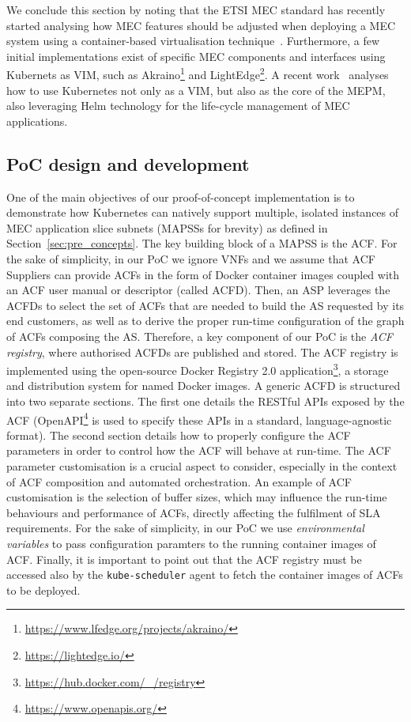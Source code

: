 We conclude this section by noting that the ETSI MEC standard has recently started analysing how MEC features should be adjusted when deploying a MEC system using a container-based virtualisation technique~\cite{MEC027}. Furthermore, a few initial implementations exist of specific MEC components and interfaces using Kubernets as VIM, such as Akraino\footnote{\url{https://www.lfedge.org/projects/akraino/}} and LightEdge\footnote{\url{https://lightedge.io/}}. A recent work~\cite{2020_broadnets_mec_k8s} analyses how to use Kubernetes not only as a VIM, but also as the core of the MEPM, also leveraging Helm technology for the life-cycle management of MEC applications. 
%
\subsection{PoC design and development}
\label{sec:poc_design}
\noindent
%
One of the main objectives of our proof-of-concept implementation is to demonstrate how Kubernetes can natively support multiple, isolated instances of MEC application slice subnets (MAPSSs for brevity) as defined in Section~\ref{sec:pre_concepts}. The key building block of a MAPSS is the ACF. For the sake of simplicity, in our PoC we ignore VNFs and we assume that ACF Suppliers can provide ACFs in the form of Docker container images coupled with an ACF user manual or descriptor (called ACFD). Then, an ASP leverages the ACFDs to select the set of ACFs that are needed to build the AS requested by its end customers, as well as to derive the proper run-time configuration of the graph of ACFs composing the AS. Therefore, a key component of our PoC is the \textit{ACF registry}, where authorised ACFDs are published and stored. The ACF registry is implemented using the open-source Docker Registry 2.0 application\footnote{\url{https://hub.docker.com/_/registry}}, a storage and distribution system for named Docker images. A generic ACFD is structured into two separate sections. The first one details the RESTful APIs exposed by the ACF (OpenAPI\footnote{\url{https://www.openapis.org/}} is used to specify these APIs in a standard, language-agnostic format). The second section details how to properly configure the ACF parameters in order to control how the ACF will behave at run-time. The ACF parameter customisation is a crucial aspect to consider, especially in the context of ACF composition and automated orchestration. An example of ACF customisation is the selection of buffer sizes, which may influence the run-time behaviours and performance of ACFs, directly affecting the fulfilment of SLA requirements. For the sake of simplicity, in our PoC we use \textit{environmental variables} to pass configuration paramters to the running container images of ACF. Finally, it is important to point out that the ACF registry must be accessed also by the \texttt{kube-scheduler} agent to fetch the container images of ACFs to be deployed.

